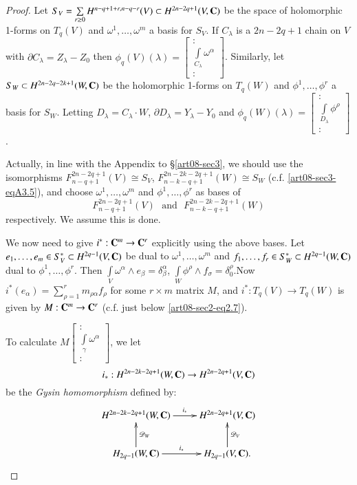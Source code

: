\begin{proof}
Let $S_{V}=\sum\limits_{r\geq 0}H^{n-q+1+r,n-q-r}(V)\subset H^{2n-2q+1}(V,\mathbf{C})$ be the space of holomorphic 1-forms on $T_{q}(V)$ and $\omega^{1},\ldots,\omega^{m}$ a basis for $S_{V}$. If $C_{\lambda}$ is a $2n-2q+1$ chain on $V$ with $\partial C_{\lambda}=Z_{\lambda}-Z_{0}$ then $\phi_{q}(V)(\lambda)=\left[\begin{smallmatrix} :\\ \int\limits_{C_{\lambda}}\omega^{\alpha}\\ :\end{smallmatrix}\right]$. Similarly, let $S_{W}\subset H^{2n-2q-2k+1}(W,\mathbf{C})$ be the holomorphic 1-forms on $T_{q}(W)$ and $\phi^{1},\ldots,\phi^{r}$ a basis for $S_{W}$. Letting $D_{\lambda}=C_{\lambda}\cdot W$, $\partial D_{\lambda}=Y_{\lambda}-Y_{0}$ and $\phi_{q}(W)(\lambda)=\left[\begin{smallmatrix} :\\ \int\limits_{D_{\lambda}}\phi^{\rho}\\ :\end{smallmatrix}\right]$.

Actually, in line with the Appendix to \S\ref{art08-sec3}, we should use the isomorphisms $F^{2n-2q+1}_{n-q+1}(V)\cong S_{V}$, $F^{2n-2k-2q+1}_{n-k-q+1}(W)\cong S_{W}$ (c.f. \eqref{art08-sec3-eqA3.5}), and choose $\omega^{1},\ldots,\omega^{m}$ and $\phi^{1},\ldots,\phi^{r}$ as bases of 
$$
F^{2n-2q+1}_{n-q+1}(V)\text{~ and~ } F^{2n-2k-2q+1}_{n-k-q+1}(W)
$$ 
respectively. We assume this is done.

We now need to give $i^{*}:\mathbf{C}^{m}\to \mathbf{C}^{r}$ explicitly using the above bases. Let $e_{1},\ldots,e_{m}\in S^{*}_{V}\subset H^{2q-1}(V,\mathbf{C})$ be dual to $\omega^{1},\ldots,\omega^{m}$ and $f_{1},\ldots,f_{r}\in S^{*}_{W}\subset H^{2q-1}(W,\mathbf{C})$ dual to $\phi^{1},\ldots,\phi^{r}$. Then $\int\limits_{V}\omega^{\alpha}\wedge e_{\beta}=\delta^{\alpha}_{\beta}$, $\int\limits_{W}\phi^{\rho}\wedge f_{\sigma}=\delta^{\rho}_{0}$.\pageoriginale Now $i^{*}(e_{\alpha})=\sum\limits^{r}_{\rho=1}m_{\rho\alpha}f_{\rho}$ for some $r\times m$ matrix $M$, and $i^{*}:T_{q}(V)\to T_{q}(W)$ is given by $M:\mathbf{C}^{m}\to \mathbf{C}^{r}$ (c.f. just below \eqref{art08-sec2-eq2.7}).

To calculate $M\left[\begin{smallmatrix} : \\ \int\limits_{\gamma}\omega^{\alpha}\\ :\end{smallmatrix}\right]$, we let 
$$
i_{*}:H^{2n-2k-2q+1}(W,\mathbf{C})\to H^{2n-2q+1}(V,\mathbf{C})
$$ 
be the {\em Gysin homomorphism} defined by:
\begin{equation}
\vcenter{\xymatrix{
H^{2n-2k-2q+1}(W,\bfC)\ar[r]^-{i_{*}} & H^{2n-2q+1}(V,\bfC)\\
H_{2q-1}(W,\bfC)\ar[u]_{\mathscr{D}_{W}}\ar[r]^-{i_{*}} & H_{2q-1}(V,\bfC).\ar[u]_{\mathscr{D}_{V}}
}}\label{art08-sec4-eq4.3}
\end{equation}


\end{proof}
